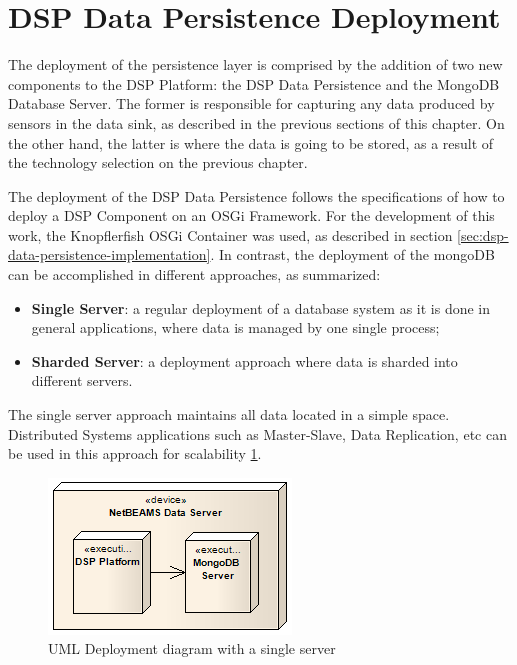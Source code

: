 \section{DSP Data Persistence Deployment}

The deployment of the persistence layer is comprised by the addition of two
new components to the DSP Platform: the DSP Data Persistence and the MongoDB
Database Server. The former is responsible for capturing any data
produced by sensors in the data sink, as described in the previous sections of
this chapter. On the other hand, the latter is where the data is going to be
stored, as a result of the technology selection on the previous chapter. 

The deployment of the DSP Data Persistence follows the specifications of how to
deploy a DSP Component on an OSGi Framework. For the development of this work,
the Knopflerfish OSGi Container was used, as described in section
\ref{sec:dsp-data-persistence-implementation}. In contrast, the
deployment of the mongoDB can be accomplished in different approaches, as
summarized: 

\begin{itemize}
  \item \textbf{Single Server}: a regular deployment of a database system as it
  is done in general applications, where data is managed by one single process;
  \item \textbf{Sharded Server}: a deployment approach where data is sharded
  into different servers.
\end{itemize} 

The single server approach maintains all data located in a simple space.
Distributed Systems applications such as Master-Slave, Data Replication, etc
can be used in this approach for scalability
\ref{fig:DSP-Data-Persistence-Deployment-Single}. 

\begin{figure}[!b]
  \centering
  \includegraphics[scale=0.7]{../diagrams/DSP-Data-Persistence-Deployment-Single}
  \caption{UML Deployment diagram with a single server}
  \label{fig:DSP-Data-Persistence-Deployment-Single}
\end{figure}

